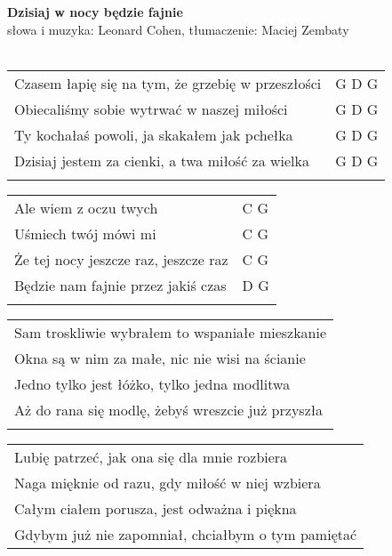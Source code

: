 \documentclass[a5paper]{article}
\begin{document}


\noindent
\fontsize{12pt}{15pt}\selectfont
\textbf{Dzisiaj w nocy będzie fajnie} \\
\fontsize{8pt}{10pt}\selectfont
słowa i muzyka: Leonard Cohen, tłumaczenie: Maciej Zembaty \\ \\
\fontsize{10pt}{12pt}\selectfont
{}
\begin{tabular}{@{}p{9.0cm}p{3cm}@{}}
\noindent
Czasem łapię się na tym, że grzebię w przeszłości & G D G \\
Obiecaliśmy sobie wytrwać w naszej miłości & G D G \\
Ty kochałaś powoli, ja skakałem jak pchełka & G D G \\
Dzisiaj jestem za cienki, a twa miłość za wielka & G D G \\ \\
\end{tabular}

\noindent
\begin{tabular}{@{}p{8.0cm}p{3cm}@{}} 
Ale wiem z oczu twych & C G \\
Uśmiech twój mówi mi & C G \\
Że tej nocy jeszcze raz, jeszcze raz & C G \\
Będzie nam fajnie przez jakiś czas & D G \\ \\
\end{tabular}

\noindent
\begin{tabular}{@{}p{9.5cm}@{}}
Sam troskliwie wybrałem to wspaniałe mieszkanie \\
Okna są w nim za małe, nic nie wisi na ścianie \\
Jedno tylko jest łóżko, tylko jedna modlitwa \\
Aż do rana się modlę, żebyś wreszcie już przyszła \\ \\
\end{tabular}

\noindent
\begin{tabular}{@{}p{9.5cm}@{}}
Lubię patrzeć, jak ona się dla mnie rozbiera \\
Naga mięknie od razu, gdy miłość w niej wzbiera \\
Całym ciałem porusza, jest odważna i piękna \\
Gdybym już nie zapomniał, chciałbym o tym pamiętać
\end{tabular}
\end{document}
